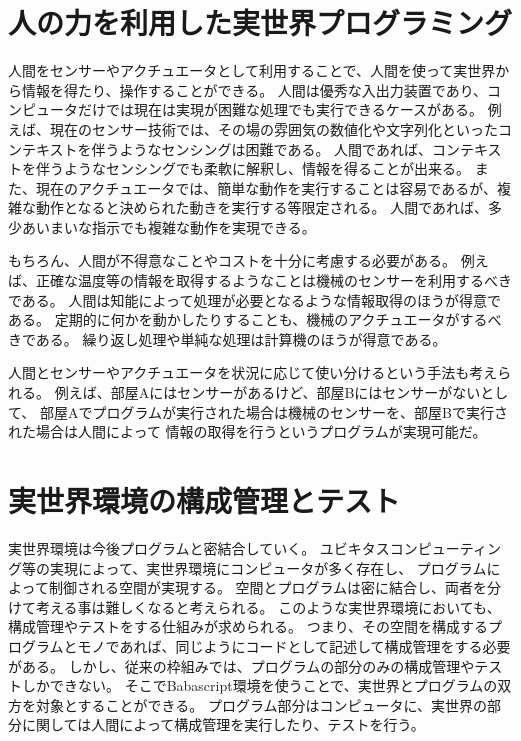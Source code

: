 \section{人の力を利用した実世界プログラミング}\label{ux4ebaux306eux529bux3092ux5229ux7528ux3057ux305fux5b9fux4e16ux754cux30d7ux30edux30b0ux30e9ux30dfux30f3ux30b0}

人間をセンサーやアクチュエータとして利用することで、人間を使って実世界から情報を得たり、操作することができる。
人間は優秀な入出力装置であり、コンピュータだけでは現在は実現が困難な処理でも実行できるケースがある。
例えば、現在のセンサー技術では、その場の雰囲気の数値化や文字列化といったコンテキストを伴うようなセンシングは困難である。
人間であれば、コンテキストを伴うようなセンシングでも柔軟に解釈し、情報を得ることが出来る。
また、現在のアクチュエータでは、簡単な動作を実行することは容易であるが、複雑な動作となると決められた動きを実行する等限定される。
人間であれば、多少あいまいな指示でも複雑な動作を実現できる。

もちろん、人間が不得意なことやコストを十分に考慮する必要がある。
例えば、正確な温度等の情報を取得するようなことは機械のセンサーを利用するべきである。
人間は知能によって処理が必要となるような情報取得のほうが得意である。
定期的に何かを動かしたりすることも、機械のアクチュエータがするべきである。
繰り返し処理や単純な処理は計算機のほうが得意である。

人間とセンサーやアクチュエータを状況に応じて使い分けるという手法も考えられる。
例えば、部屋Aにはセンサーがあるけど、部屋Bにはセンサーがないとして、
部屋Aでプログラムが実行された場合は機械のセンサーを、部屋Bで実行された場合は人間によって
情報の取得を行うというプログラムが実現可能だ。

\section{実世界環境の構成管理とテスト}\label{ux5b9fux4e16ux754cux74b0ux5883ux306eux69cbux6210ux7ba1ux7406ux3068ux30c6ux30b9ux30c8}

実世界環境は今後プログラムと密結合していく。
ユビキタスコンピューティング等の実現によって、実世界環境にコンピュータが多く存在し、
プログラムによって制御される空間が実現する。
空間とプログラムは密に結合し、両者を分けて考える事は難しくなると考えられる。
このような実世界環境においても、構成管理やテストをする仕組みが求められる。
つまり、その空間を構成するプログラムとモノであれば、同じようにコードとして記述して構成管理をする必要がある。
しかし、従来の枠組みでは、プログラムの部分のみの構成管理やテストしかできない。
そこでBabascript環境を使うことで、実世界とプログラムの双方を対象とすることができる。
プログラム部分はコンピュータに、実世界の部分に関しては人間によって構成管理を実行したり、テストを行う。

